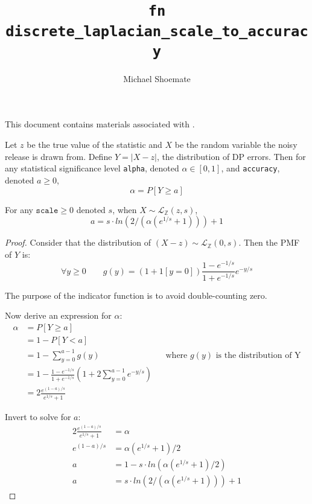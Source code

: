 \documentclass{article}
\title{\texttt{fn discrete\_laplacian\_scale\_to\_accuracy}}
\author{Michael Shoemate}
\begin{document}
\maketitle

This document contains materials associated with .

\begin{definition}
    Let $z$ be the true value of the statistic and $X$ be the random variable the noisy release is drawn from.
    Define $Y = |X - z|$, the distribution of DP errors. 
    Then for any statistical significance level \texttt{alpha}, denoted $\alpha \in [0, 1]$, and \texttt{accuracy}, denoted $a \ge 0$,
    \begin{equation}
        \alpha = P[Y \ge a]
    \end{equation}
\end{definition}

\begin{theorem}
    For any $\texttt{scale} \ge 0$ denoted $s$, when $X \sim \mathcal{L}_\mathbb{Z}(z, s)$, 
    \begin{equation}
        a = s \cdot ln(2 / (\alpha (e^{1/s} + 1))) + 1
    \end{equation}
\end{theorem}

\begin{proof}

Consider that the distribution of $(X - z) \sim \mathcal{L}_\mathbb{Z}(0, s)$.
Then the PMF of $Y$ is:
\begin{equation}
    \forall y \ge 0 \qquad g(y) = (1 + 1[y = 0]) \frac{1 - e^{-1/s}}{1 + e^{-1/s}} e^{-y/s}
\end{equation}

The purpose of the indicator function is to avoid double-counting zero.

Now derive an expression for $\alpha$:
\begin{align*}
    \alpha &= P[Y \ge a] \\
    &= 1 - P[Y < a] \\
    &= 1 - \sum_{y=0}^{a - 1} g(y) && \text{where $g(y)$ is the distribution of Y} \\
    &= 1 - \frac{1 - e^{-1/s}}{1 + e^{-1/s}} \left(1 + 2\sum_{y=0}^{a - 1} e^{-y/s}\right) \\
    &= 2 \frac{e^{(1 - a)/s}}{e^{1/s} + 1}
\end{align*}

Invert to solve for $a$:
\begin{align*}
    2 \frac{e^{(1 - a)/s}}{e^{1/s} + 1} &= \alpha \\
    e^{(1 - a)/s} &= \alpha (e^{1/s} + 1) / 2 \\
    a &= 1 - s \cdot ln(\alpha (e^{1/s} + 1) / 2) \\
    a &= s \cdot ln(2 / (\alpha (e^{1/s} + 1))) + 1
\end{align*}

\end{proof}
\end{document}
